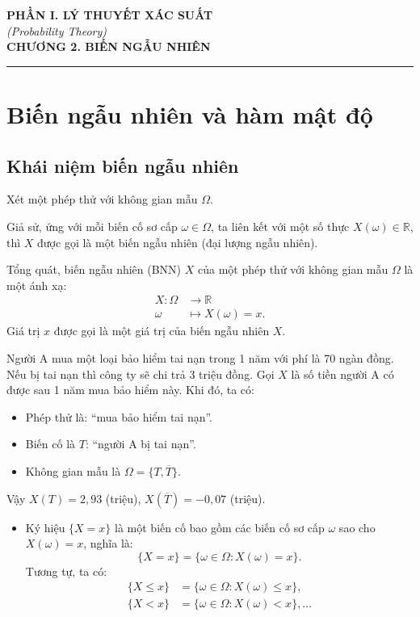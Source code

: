 \begin{center}
    {\large \textbf{PHẦN I. LÝ THUYẾT XÁC SUẤT}}\\[0.3em]
    {\normalsize \textit{(Probability Theory)}}\\[1em]
    {\LARGE \textbf{CHƯƠNG 2. BIẾN NGẪU NHIÊN}}
\end{center}

\vspace{1em}
\hrule
\vspace{1.5em}

\section{Biến ngẫu nhiên và hàm mật độ}

\subsection{Khái niệm biến ngẫu nhiên}
Xét một phép thử với không gian mẫu $\Omega$.

Giả sử, ứng với mỗi biến cố sơ cấp $\omega \in \Omega$, ta liên kết với một số thực $X(\omega) \in \mathbb{R}$, thì $X$ được gọi là một biến ngẫu nhiên (đại lượng ngẫu nhiên).

Tổng quát, biến ngẫu nhiên (BNN) $X$ của một phép thử với không gian mẫu $\Omega$ là một ánh xạ:
\begin{align*}
X: \Omega &\to \mathbb{R} \\
\omega &\mapsto X(\omega) = x.
\end{align*}
Giá trị $x$ được gọi là một giá trị của biến ngẫu nhiên $X$.

\begin{vidu}
Người A mua một loại bảo hiểm tai nạn trong 1 năm với phí là 70 ngàn đồng. Nếu bị tai nạn thì công ty sẽ chi trả 3 triệu đồng. Gọi $X$ là số tiền người A có được sau 1 năm mua bảo hiểm này. Khi đó, ta có:
\begin{itemize}
    \item Phép thử là: ``mua bảo hiểm tai nạn''.
    \item Biến cố là $T$: ``người A bị tai nạn''.
    \item Không gian mẫu là $\Omega = \{T, \overline{T}\}$.
\end{itemize}
Vậy $X(T) = 2{,}93$ (triệu), $X(\overline{T}) = -0{,}07$ (triệu).
\end{vidu}

\begin{itemize}
    \item Ký hiệu $\{X = x\}$ là một biến cố bao gồm các biến cố sơ cấp $\omega$ sao cho $X(\omega) = x$, nghĩa là:
    \[
    \{X = x\} = \{\omega \in \Omega : X(\omega) = x\}.
    \]
    Tương tự, ta có:
    \begin{align*}
    \{X \le x\} &= \{\omega \in \Omega : X(\omega) \le x\}, \\
    \{X < x\} &= \{\omega \in \Omega : X(\omega) < x\}, \dots
    \end{align*}
\end{itemize}

